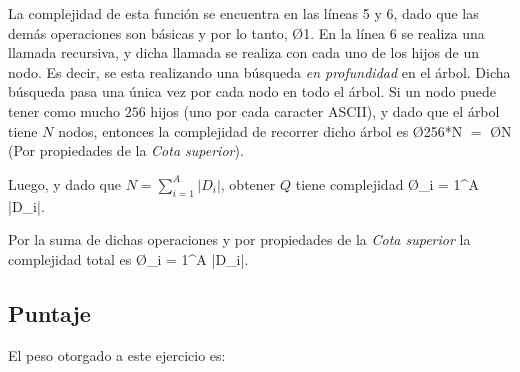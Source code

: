 La complejidad de esta función se encuentra en las líneas 5 y 6, dado que las demás operaciones son básicas y por lo tanto, \O{1}.
En la línea 6 se realiza una llamada recursiva, y dicha llamada se realiza con cada uno de los hijos de un nodo. Es decir, se esta realizando una búsqueda \emph{en profundidad} en el árbol.
Dicha búsqueda pasa una única vez por cada nodo en todo el árbol. Si un nodo puede tener como mucho $256$ hijos (uno por cada caracter ASCII), y dado que el árbol tiene $N$ nodos, entonces la complejidad de recorrer dicho árbol es \O{256*N} $ = $ \O{N} (Por propiedades de la \emph{Cota superior}).

Luego, y dado que $N = \displaystyle \sum_{i = 1}^{A} |D_i|$, obtener $Q$ tiene complejidad \O{\displaystyle \sum_{i = 1}^{A} |D_i|}.

Por la suma de dichas operaciones y por propiedades de la \emph{Cota superior} la complejidad total es \O{\displaystyle \sum_{i = 1}^{A} |D_i|}.

\subsection{Puntaje}
El peso otorgado a este ejercicio es:
